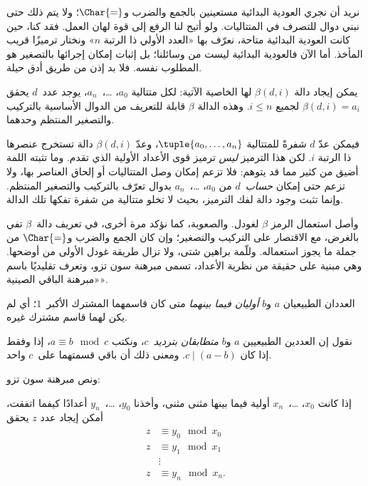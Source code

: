 \documentclass[../../../include/open-logic-section]{subfiles}
\begin{document}

نريد أن نجري العودية البدائية مستعينين بالجمع والضرب
و$\Char{=}$؛ ولا يتم ذلك حتى نبني دوال للتصرف في المتتاليات.
ولو أتيح لنا الرفع إلى قوة لهان العمل. فقد كنا، حين كانت العودية البدائية
متاحة، نعرّف بها «العدد الأولي ذا الرتبة $n$» ونختار ترميزًا قريب المأخذ.
أما الآن فالعودية البدائية ليست من وسائلنا؛ بل إثبات إمكان إجرائها
بالتصغير هو المطلوب نفسه. فلا بد إذن من طريق أدق حيلة.

\begin{lem}
يمكن إيجاد دالة $\beta(d,i)$ لها الخاصية الآتية: لكل متتالية $a_0$، \dots،~$a_n$،
يوجد عدد~$d$ يحقق $\beta(d,i)=a_i$ لجميع $i\le n$.
وهذه الدالة $\beta$ قابلة للتعريف من الدوال الأساسية بالتركيب والتصغير
المنتظم وحدهما.
\end{lem}

فيمكن عدّ $d$ شفرةً للمتتالية $\tuple{a_0,\dots,a_n}$، وعدّ
$\beta(d,i)$ دالة تستخرج عنصرها ذا الرتبة $i$. لكن هذا الترميز
\emph{ليس} ترميز قوى الأعداد الأولية الذي تقدم. وما تثبته اللمة أضيق من
كثير مما قد يتوهم: فلا تزعم إمكان وصل المتتاليات أو إلحاق العناصر بها،
ولا تزعم حتى إمكان \emph{حساب}~$d$ من $a_0$، \dots،~$a_n$
بدوال تعرّف بالتركيب والتصغير المنتظم. وإنما تثبت وجود دالة لفك الترميز،
بحيث لا تخلو متتالية من شفرة تفكها تلك الدالة.

وأصل استعمال الرمز $\beta$ لغودل. والصعوبة، كما نؤكد مرة أخرى، في
تعريف دالة~$\beta$ تفي بالغرض، مع الاقتصار على التركيب والتصغير؛ وإن كان
الجمع والضرب و$\Char{=}$ من جملة ما يجوز استعماله. وللّمة براهين شتى،
ولا تزال طريقة غودل الأولى من أوضحها. وهي مبنية على حقيقة من نظرية الأعداد،
تسمى مبرهنة سون تزو، وتعرف تقليديًا باسم «مبرهنة الباقي الصينية».

\begin{defn}
العددان الطبيعيان $a$ و$b$ \emph{أوليان فيما بينهما} متى كان
قاسمهما المشترك الأكبر~$1$؛ أي لم يكن لهما قاسم مشترك غيره.
\end{defn}

\begin{defn}
نقول إن العددين الطبيعيين $a$ و$b$ \emph{متطابقان بترديد~$c$}، ونكتب
$a\equiv b\mod c$، إذا وفقط إذا كان $c\mid(a-b)$.
ومعنى ذلك أن باقي قسمتهما على~$c$ واحد.
\end{defn}

ونص مبرهنة سون تزو:
\begin{thm}
إذا كانت $x_0$، \dots،~$x_n$ أولية فيما بينها مثنى مثنى، وأخذنا
$y_0$، \dots،~$y_n$ أعدادًا كيفما اتفقت، أمكن إيجاد عدد $z$ يحقق
\begin{align*}
z & \equiv y_0 \mod x_0 \\
z & \equiv y_1 \mod x_1 \\
& \vdots  \\
z & \equiv y_n \mod x_n.
\end{align*}
\end{thm}
\end{document}
